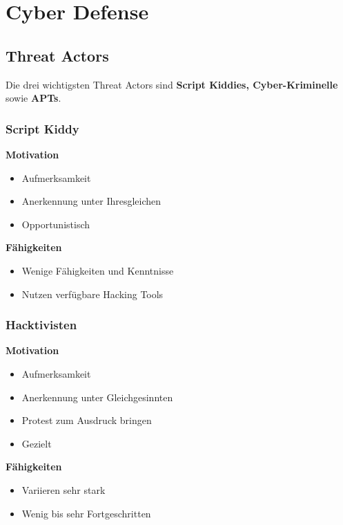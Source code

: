 

\section{Cyber Defense}

\subsection{Threat Actors}
Die drei wichtigsten Threat Actors sind \textbf{Script Kiddies, Cyber-Kriminelle} sowie \textbf{APTs}.

\subsubsection{Script Kiddy}

\begin{minipage}{0.5\linewidth}
    \textbf{Motivation}
    \begin{itemize}
        \item Aufmerksamkeit
        \item Anerkennung unter Ihresgleichen
        \item Opportunistisch
    \end{itemize}
\end{minipage}
\begin{minipage}{0.45\linewidth}
    \textbf{Fähigkeiten}\\
    \begin{itemize}
        \item Wenige Fähigkeiten und Kenntnisse
        \item Nutzen verfügbare Hacking Tools
    \end{itemize}
\end{minipage}

\subsubsection{Hacktivisten}

\begin{minipage}{0.5\linewidth}
    \textbf{Motivation}
    \begin{itemize}
        \item Aufmerksamkeit
        \item Anerkennung unter Gleichgesinnten
        \item Protest zum Ausdruck bringen
        \item Gezielt\\
    \end{itemize}
\end{minipage}
\begin{minipage}{0.45\linewidth}
    \textbf{Fähigkeiten}\\
    \begin{itemize}
        \item Variieren sehr stark
        \item Wenig bis sehr Fortgeschritten
    \end{itemize}
\end{minipage}

